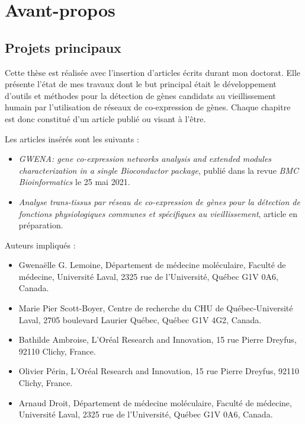 \chapter*{Avant-propos}         %


\section{Projets principaux}

Cette thèse est réalisée avec l'insertion d’articles écrits durant mon doctorat. Elle présente l’état de mes travaux dont le but principal était le développement d’outils et méthodes pour la détection de gènes candidats au vieillissement humain par l'utilisation de réseaux de co-expression de gènes. Chaque chapitre est donc constitué d'un article publié ou visant à l'être.

Les articles insérés sont les suivants :
\begin{itemize}
    \item \textit{GWENA: gene co-expression networks analysis and extended modules characterization in a single Bioconductor package}, publié dans la revue \textit{BMC Bioinformatics} le 25 mai 2021.
    \item \textit{Analyse trans-tissus par réseau de co-expression de gènes pour la détection de fonctions physiologiques communes et spécifiques au vieillissement}, article en préparation.
\end{itemize}

Auteurs impliqués :
\begin{itemize}
    \item Gwenaëlle G. Lemoine, Département de médecine moléculaire, Faculté de médecine, Université Laval, 2325 rue de l’Université, Québec G1V 0A6, Canada. 
    \item Marie Pier Scott-Boyer, Centre de recherche du CHU de Québec‑Université Laval, 2705 boulevard Laurier Québec, Québec G1V 4G2, Canada.
    \item Bathilde Ambroise, L’Oréal Research and Innovation, 15 rue Pierre Dreyfus, 92110 Clichy, France.
    \item Olivier Périn, L’Oréal Research and Innovation, 15 rue Pierre Dreyfus, 92110 Clichy, France.
    \item Arnaud Droit, Département de médecine moléculaire, Faculté de médecine, Université Laval, 2325 rue de l’Université, Québec G1V 0A6, Canada. 
\end{itemize}

